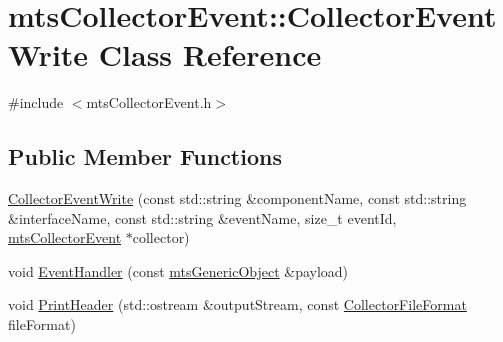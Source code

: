 \hypertarget{classmts_collector_event_1_1_collector_event_write}{\section{mts\-Collector\-Event\-:\-:Collector\-Event\-Write Class Reference}
\label{classmts_collector_event_1_1_collector_event_write}
}


{\ttfamily \#include $<$mts\-Collector\-Event.\-h$>$}

\subsection*{Public Member Functions}
\begin{DoxyCompactItemize}
\item 
\hyperlink{classmts_collector_event_1_1_collector_event_write_abe8f342fbb5e55e9a34fc54859e8fc15}{Collector\-Event\-Write} (const std\-::string \&component\-Name, const std\-::string \&interface\-Name, const std\-::string \&event\-Name, size\-\_\-t event\-Id, \hyperlink{classmts_collector_event}{mts\-Collector\-Event} $\ast$collector)
\item 
void \hyperlink{classmts_collector_event_1_1_collector_event_write_ae7e09b465fae4bc519b01505c2898c6c}{Event\-Handler} (const \hyperlink{classmts_generic_object}{mts\-Generic\-Object} \&payload)
\item 
void \hyperlink{classmts_collector_event_1_1_collector_event_write_ad9d9698159b9105a5580cc2f92e1f749}{Print\-Header} (std\-::ostream \&output\-Stream, const \hyperlink{classmts_collector_base_aa228bed8144053d0bfa316f9ac9d0901}{Collector\-File\-Format} file\-Format)
\end{DoxyCompactItemize}
